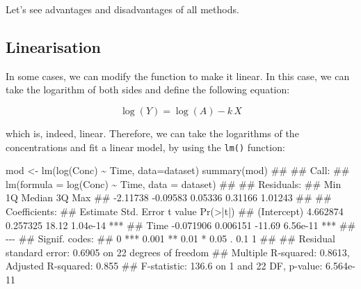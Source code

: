 \documentclass[a4paper,12pt,oneside]{book}
\newenvironment{Shaded}{\begin{snugshade}}{\end{snugshade}}
\newcommand{\SpecialCharTok}[1]{#1}
\newcommand{\DocumentationTok}[1]{#1}
\newcommand{\OtherTok}[1]{#1}
\newcommand{\FunctionTok}[1]{#1}
\newcommand{\AttributeTok}[1]{#1}
\newcommand{\NormalTok}[1]{#1}
\begin{document}
Let's see advantages and disadvantages of all methods.

\hypertarget{linearisation}{%
\subsection{Linearisation}\label{linearisation}}

In some cases, we can modify the function to make it linear. In this case, we can take the logarithm of both sides and define the following equation:

\[ \log(Y) = \log(A) - k \, X \]

which is, indeed, linear. Therefore, we can take the logarithms of the concentrations and fit a linear model, by using the \texttt{lm()} function:

\vspace{12pt}

\begin{Shaded}
\begin{Highlighting}[]
\NormalTok{mod }\OtherTok{\textless{}{-}} \FunctionTok{lm}\NormalTok{(}\FunctionTok{log}\NormalTok{(Conc) }\SpecialCharTok{\textasciitilde{}}\NormalTok{ Time, }\AttributeTok{data=}\NormalTok{dataset)}
\FunctionTok{summary}\NormalTok{(mod)}
\DocumentationTok{\#\# }
\DocumentationTok{\#\# Call:}
\DocumentationTok{\#\# lm(formula = log(Conc) \textasciitilde{} Time, data = dataset)}
\DocumentationTok{\#\# }
\DocumentationTok{\#\# Residuals:}
\DocumentationTok{\#\#      Min       1Q   Median       3Q      Max }
\DocumentationTok{\#\# {-}2.11738 {-}0.09583  0.05336  0.31166  1.01243 }
\DocumentationTok{\#\# }
\DocumentationTok{\#\# Coefficients:}
\DocumentationTok{\#\#              Estimate Std. Error t value Pr(\textgreater{}|t|)    }
\DocumentationTok{\#\# (Intercept)  4.662874   0.257325   18.12 1.04e{-}14 ***}
\DocumentationTok{\#\# Time        {-}0.071906   0.006151  {-}11.69 6.56e{-}11 ***}
\DocumentationTok{\#\# {-}{-}{-}}
\DocumentationTok{\#\# Signif. codes:  }
\DocumentationTok{\#\# 0 \textquotesingle{}***\textquotesingle{} 0.001 \textquotesingle{}**\textquotesingle{} 0.01 \textquotesingle{}*\textquotesingle{} 0.05 \textquotesingle{}.\textquotesingle{} 0.1 \textquotesingle{} \textquotesingle{} 1}
\DocumentationTok{\#\# }
\DocumentationTok{\#\# Residual standard error: 0.6905 on 22 degrees of freedom}
\DocumentationTok{\#\# Multiple R{-}squared:  0.8613, Adjusted R{-}squared:  0.855 }
\DocumentationTok{\#\# F{-}statistic: 136.6 on 1 and 22 DF,  p{-}value: 6.564e{-}11}
\end{Highlighting}
\end{Shaded}
\end{document}
